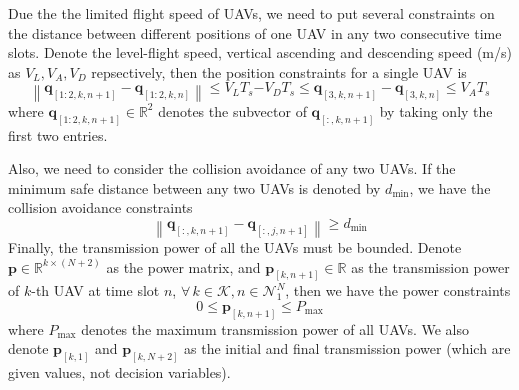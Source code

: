 \documentclass[10pt,final,conference]{IEEEtran}
\begin{document}
Due the the limited flight speed of UAVs, we need to put several constraints on the distance between different positions of one UAV in any two consecutive time slots. Denote the level-flight speed, vertical ascending and descending speed (m/s) as $V_L,V_A,V_D$ repsectively, then the position constraints for a single UAV is
\begin{subequations}
	\begin{equation}\label{Eq2.1}
	\left\lVert\boldsymbol{q}_{[1:2,k,n+1]}-\boldsymbol{q}_{[1:2,k,n]}\right\rVert\leq V_LT_s
	\end{equation}
	\begin{equation}\label{Eq2.2}
	-V_DT_s\leq\boldsymbol{q}_{[3,k,n+1]}-\boldsymbol{q}_{[3,k,n]}\leq V_AT_s
	\end{equation}
\end{subequations}
where $\boldsymbol{q}_{[1:2,k,n+1]}\in\mathbb{R}^2$ denotes the subvector of $\boldsymbol{q}_{[:,k,n+1]}$ by taking only the first two entries.

Also, we need to consider the collision avoidance of any two UAVs. If the minimum safe distance between any two UAVs is denoted by $d_{\min}$, we have the collision avoidance constraints
\begin{equation}\label{Eq3}
\left\lVert\boldsymbol{q}_{[:,k,n+1]}-\boldsymbol{q}_{[:,j,n+1]}\right\rVert\geq d_{\min}
\end{equation}
Finally, the transmission power of all the UAVs must be bounded. Denote $\boldsymbol{p}\in\mathbb{R}^{k\times (N+2)}$ as the power matrix, and $\boldsymbol{p}_{[k,n+1]}\in\mathbb{R}$ as the transmission power of $k$-th UAV at time slot $n$, $\forall\,k\in\mathcal{K},n\in\mathcal{N}_1^N$, then we have the power constraints
\begin{equation}\label{Eq4}
0\leq \boldsymbol{p}_{[k,n+1]}\leq P_{\max}
\end{equation}
where $P_{\max}$ denotes the maximum transmission power of all UAVs. We also denote $\boldsymbol{p}_{[k,1]}$ and $\boldsymbol{p}_{[k,N+2]}$ as the initial and final transmission power (which are given values, not decision variables).
\end{document}
